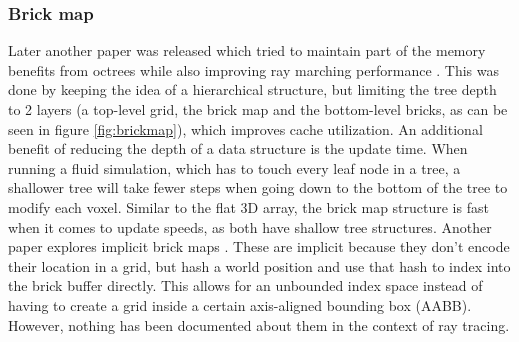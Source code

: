 \begin{figure}[H]
    \centering
    \hfill
\end{figure}

\subsubsection{Brick map} \label{related_work:voxel_data_structures:brickmap}
Later another paper was released which tried to maintain part of the memory benefits from octrees while also improving ray marching performance \cite{van2015real}. This was done by keeping the idea of a hierarchical structure, but limiting the tree depth to 2 layers (a top-level grid, the brick map and the bottom-level bricks, as can be seen in figure \ref{fig:brickmap}), which improves cache utilization. An additional benefit of reducing the depth of a data structure is the update time. When running a fluid simulation, which has to touch every leaf node in a tree, a shallower tree will take fewer steps when going down to the bottom of the tree to modify each voxel. Similar to the flat 3D array, the brick map structure is fast when it comes to update speeds, as both have shallow tree structures. Another paper explores implicit brick maps \cite{niessner2013real}. These are implicit because they don't encode their location in a grid, but hash a world position and use that hash to index into the brick buffer directly. This allows for an unbounded index space instead of having to create a grid inside a certain axis-aligned bounding box (AABB). However, nothing has been documented about them in the context of ray tracing.


